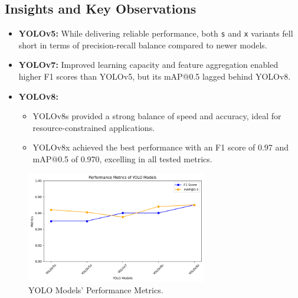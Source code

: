 \documentclass[letterpaper,11pt]{report}
\begin{document}
\subsection{Insights and Key Observations}
\begin{itemize}
    \item \textbf{YOLOv5:} While delivering reliable performance, both \texttt{s} and \texttt{x} variants fell short in terms of precision-recall balance compared to newer models.
    \item \textbf{YOLOv7:} Improved learning capacity and feature aggregation enabled higher F1 scores than YOLOv5, but its mAP@0.5 lagged behind YOLOv8.
    \item \textbf{YOLOv8:}
          \begin{itemize}
              \item YOLOv8s provided a strong balance of speed and accuracy, ideal for resource-constrained applications.
              \item YOLOv8x achieved the best performance with an F1 score of 0.97 and mAP@0.5 of 0.970, excelling in all tested metrics.
          \end{itemize}
\end{itemize}

\begin{figure}[H]
\centering
\includegraphics[width=0.7\textwidth]{yoloperf.png}  %
\caption{YOLO Models' Performance Metrics.}
\label{fig:yolo-performance}
\end{figure}


\end{document}
